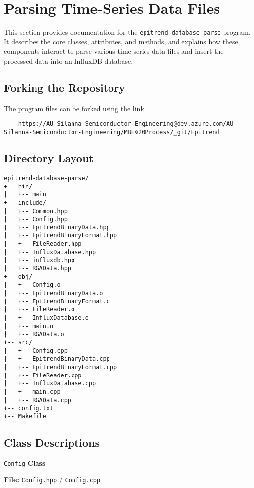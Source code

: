 \documentclass{article}
\begin{document}


\section{Parsing Time-Series Data Files}
This section provides documentation for the \texttt{epitrend-database-parse} program. It describes the core classes, attributes, and methods, and explains how these components interact to parse various time-series data files and insert the processed data into an InfluxDB database. 

\subsection{Forking the Repository}
The program files can be forked using the link:
\begin{lstlisting}
    https://AU-Silanna-Semiconductor-Engineering@dev.azure.com/AU-Silanna-Semiconductor-Engineering/MBE%20Process/_git/Epitrend
\end{lstlisting}

\subsection{Directory Layout}
\begin{verbatim}
epitrend-database-parse/
+-- bin/
|   +-- main
+-- include/
|   +-- Common.hpp
|   +-- Config.hpp
|   +-- EpitrendBinaryData.hpp
|   +-- EpitrendBinaryFormat.hpp
|   +-- FileReader.hpp
|   +-- InfluxDatabase.hpp
|   +-- influxdb.hpp
|   +-- RGAData.hpp
+-- obj/
|   +-- Config.o
|   +-- EpitrendBinaryData.o
|   +-- EpitrendBinaryFormat.o
|   +-- FileReader.o
|   +-- InfluxDatabase.o
|   +-- main.o
|   +-- RGAData.o
+-- src/
|   +-- Config.cpp
|   +-- EpitrendBinaryData.cpp
|   +-- EpitrendBinaryFormat.cpp
|   +-- FileReader.cpp
|   +-- InfluxDatabase.cpp
|   +-- main.cpp
|   +-- RGAData.cpp
+-- config.txt
+-- Makefile
\end{verbatim}

\subsection{Class Descriptions}
\texttt{Config} \textbf{Class}

\vspace{5pt}
\noindent
\textbf{File:} \texttt{Config.hpp} / \texttt{Config.cpp} 
\end{document}
